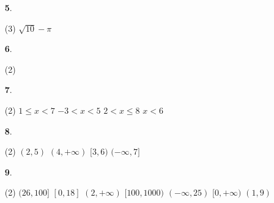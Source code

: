 \documentclass[a4paper, pdf, twoside]{book}
\begin{document}
\begin{multicols}{2}
\begin{enumerate}

 \item[\fontfamily{phv}\selectfont\color{blue}\textbf{5}. ] 
 \begin{tasks}[column-sep=1em, item-indent=1.3333em](3)
	 \task $\sqrt {10}-\pi $
\end{tasks}
 \end{enumerate}
\begin{enumerate}
\vspace{0.25cm}



 \item[\fontfamily{phv}\selectfont\color{blue}\textbf{6}. ] 
 \begin{tasks}[column-sep=1em, item-indent=1.3333em](2)
\end{tasks}
\vspace{0.25cm}



 \item[\fontfamily{phv}\selectfont\color{blue}\textbf{7}. ] 
 \begin{tasks}[column-sep=1em, item-indent=1.3333em](2)
	 \task $1\leq x<7$
	 \task $-3<x<5$
	 \task $2<x\leq 8$
	 \task $x<6$
\end{tasks}
\vspace{0.25cm}



 \item[\fontfamily{phv}\selectfont\color{blue}\textbf{8}. ] 
 \begin{tasks}[column-sep=1em, item-indent=1.3333em](2)
	 \task $(2,5)$
	 \task $(4,+\infty )$
	 \task $[3,6)$
	 \task $(-\infty ,7]$
\end{tasks}
\vspace{0.25cm}



 \item[\fontfamily{phv}\selectfont\color{blue}\textbf{9}. ] 
 \begin{tasks}[column-sep=1em, item-indent=1.3333em](2)
	 \task $(26,100]$
	 \task $[0,18]$
	 \task $(2,+\infty )$
	 \task $[100,1000)$
	 \task $(-\infty ,25)$
	 \task $[0,+\infty )$
	 \task $(1,9)$
\end{tasks}
 \end{enumerate}
\vspace{0.3cm}


\end{multicols}
\end{document}
